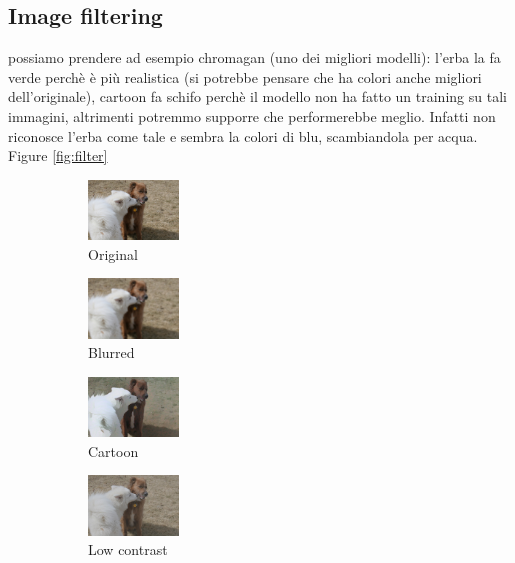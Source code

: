 \subsection{Image filtering}
possiamo prendere ad esempio chromagan (uno dei migliori modelli): l'erba la fa verde perchè è più realistica (si potrebbe pensare che ha colori anche migliori dell'originale), cartoon fa schifo perchè il modello non ha fatto un training su tali immagini, altrimenti potremmo supporre che performerebbe meglio. Infatti non riconosce l'erba come tale e sembra la colori di blu, scambiandola per acqua.
Figure \ref{fig:filter}

\begin{figure}[t]
	\centering
	\captionsetup[subfigure]{labelformat=empty}
		\begin{subfigure}[b]{0.1\textwidth}
		\centering
		\includegraphics[width=2.4cm]{orig - filter.jpeg}
		\caption{Original}
		\end{subfigure}
		\hfill
		\begin{subfigure}[b]{0.1\textwidth}
			\includegraphics[width=2.4cm]{orig - filter - blur.jpeg}
			\caption{Blurred}
		\end{subfigure}
		\hfill
		\begin{subfigure}[b]{0.1\textwidth}
			\includegraphics[width=2.4cm]{orig - filter - cartoon.jpeg}
			\caption{Cartoon}
		\end{subfigure}
		\hfill
		\begin{subfigure}[b]{0.1\textwidth}
			\includegraphics[width=2.4cm]{orig - filter - man contr (2).jpg}
			\caption{Low contrast}
		\end{subfigure}
		\hfill
		\begin{subfigure}[b]{0.1\textwidth}

\end{subfigure}
\end{figure}
